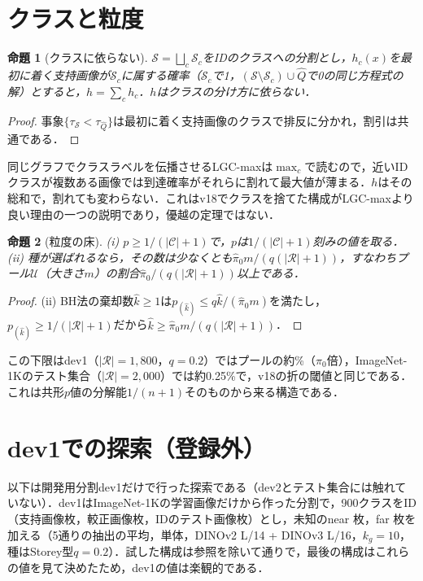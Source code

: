 \documentclass[a4paper,10pt,dvipdfmx]{jsarticle}
\newtheorem{proposition}{命題}
\theoremstyle{definition}
\newcommand{\cS}{\mathcal{S}}
\newcommand{\cR}{\mathcal{R}}
\newcommand{\cC}{\mathcal{C}}
\newcommand{\cU}{\mathcal{U}}
\newcommand{\hQ}{\hat{Q}}
\begin{document}
\section{クラスと粒度}
\begin{proposition}[クラスに依らない]
$\cS=\bigsqcup_c\cS_c$をIDのクラスへの分割とし，$h_c(x)$を最初に着く支持画像が$\cS_c$に属する確率（$\cS_c$で1，$(\cS\setminus\cS_c)\cup\hQ$で0の同じ方程式の解）とすると，$h=\sum_ch_c$．$h$はクラスの分け方に依らない．
\end{proposition}
\begin{proof}
事象$\{\tau_{\cS}<\tau_{\hQ}\}$は最初に着く支持画像のクラスで排反に分かれ，割引は共通である．
\end{proof}
同じグラフでクラスラベルを伝播させるLGC-maxは$\max_c$で読むので，近いIDクラスが複数ある画像では到達確率がそれらに割れて最大値が薄まる．$h$はその総和で，割れても変わらない．これはv18でクラスを捨てた構成がLGC-maxより良い理由の一つの説明であり，優越の定理ではない．

\begin{proposition}[粒度の床]
(i) $p\ge1/(|\cC|+1)$で，$p$は$1/(|\cC|+1)$刻みの値を取る．(ii) 種が選ばれるなら，その数は少なくとも$\hat\pi_0m/(q(|\cR|+1))$，すなわちプール$\cU$（大きさ$m$）の割合$\hat\pi_0/(q(|\cR|+1))$以上である．
\end{proposition}
\begin{proof}
(ii) BH法の棄却数$\hat k\ge1$は$p_{(\hat k)}\le q\hat k/(\hat\pi_0m)$を満たし，$p_{(\hat k)}\ge1/(|\cR|+1)$だから$\hat k\ge\hat\pi_0m/(q(|\cR|+1))$．
\end{proof}
この下限はdev1（$|\cR|=1{,}800$，$q{=}0.2$）ではプールの約\NFloorFrac\%（$\hat\pi_0$倍），ImageNet-1Kのテスト集合（$|\cR|=2{,}000$）では約0.25\%で，v18の折の閾値と同じである．これは共形$p$値の分解能$1/(n+1)$そのものから来る構造である．

\section{dev1での探索（登録外）}
\label{sec:dev1}
以下は開発用分割dev1だけで行った探索である（dev2とテスト集合には触れていない）．dev1はImageNet-1Kの学習画像だけから作った分割で，900クラスをID（支持画像\NNs{}枚，較正画像\NNc{}枚，IDのテスト画像\NNid{}枚）とし，未知のnear \NNoodNear{}枚，far \NNoodFar{}枚を加える（5通りの抽出の平均，単体，DINOv2 L/14 + DINOv3 L/16，$k_g{=}10$，種はStorey型$q{=}0.2$）．試した構成は参照を除いて\NNCfg{}通りで，最後の構成はこれらの値を見て決めたため，dev1の値は楽観的である．
\end{document}
